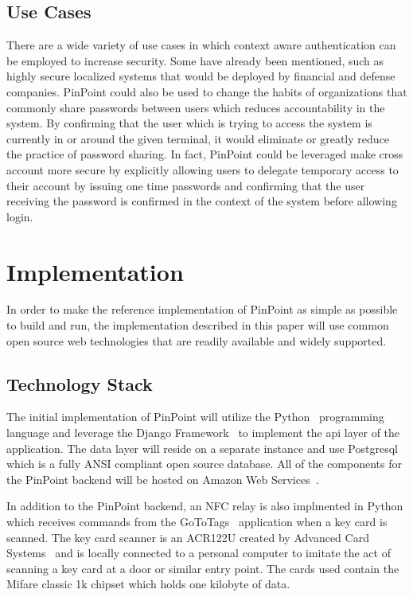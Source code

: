 \documentclass[11pt,journal]{IEEEtran}
\begin{document}
\subsection{Use Cases}
There are a wide variety of use cases in which context aware authentication can be employed to increase security.  Some have already been mentioned, such as highly secure localized systems that would be deployed by financial and defense companies.  PinPoint could also be used to change the habits of organizations that commonly share passwords between users which reduces accountability in the system.  By confirming that the user which is trying to access the system is currently in or around the given terminal, it would eliminate or greatly reduce the practice of password sharing.  In fact, PinPoint could be leveraged make cross account more secure by explicitly allowing users to delegate temporary access to their account by issuing one time passwords and confirming that the user receiving the password is confirmed in the context of the system before allowing login.

\section{Implementation}
In order to make the reference implementation of PinPoint as simple as possible to build and run, the implementation described in this paper will use common open source web technologies that are readily available and widely supported.

\subsection{Technology Stack}
The initial implementation of PinPoint will utilize the Python~\cite{python} programming language and leverage the Django Framework~\cite{django} to implement the api layer of the application.  The data layer will reside on a separate instance and use Postgresql~\cite{postgresql} which is a fully ANSI compliant open source database.  All of the components for the PinPoint backend will be hosted on Amazon Web Services~\cite{aws}.

In addition to the PinPoint backend, an NFC relay is also implmented in Python which receives commands from the GoToTags~\cite{gototags} application when a key card is scanned.  The key card scanner is an ACR122U created by Advanced Card Systems~\cite{acr122u} and is locally connected to a personal computer to imitate the act of scanning a key card at a door or similar entry point.  The cards used contain the Mifare classic 1k chipset which holds one kilobyte of data.   
\end{document}
